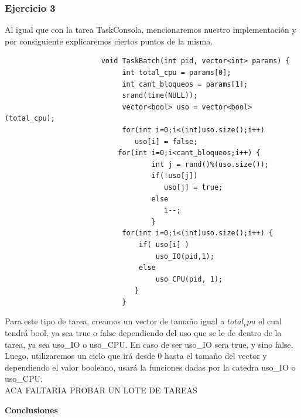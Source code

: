 \subsubsection[Resolución Ejercicio 3]{Ejercicio 3}

\indent Al igual que con la tarea TaskConsola, mencionaremos nuestro implementación y por consiguiente  
explicaremos ciertos puntos de la misma.\\
 \begin{verbatim}
                       void TaskBatch(int pid, vector<int> params) {
                            int total_cpu = params[0];
                            int cant_bloqueos = params[1];
                            srand(time(NULL));
                            vector<bool> uso = vector<bool>(total_cpu);
                            for(int i=0;i<(int)uso.size();i++) 
                               uso[i] = false;
	                       for(int i=0;i<cant_bloqueos;i++) {
                                   int j = rand()%(uso.size());
                                   if(!uso[j])
                                      uso[j] = true;
                                   else
                                      i--; 
                                   }
                            for(int i=0;i<(int)uso.size();i++) {
                                if( uso[i] )
                                    uso_IO(pid,1); 
                                else
                                    uso_CPU(pid, 1); 
                               }
                            }
 \end{verbatim}

 \indent Para este tipo de tarea, creamos un vector de tamaño igual a $total_cpu$ el cual tendrá bool, ya sea true o false
 dependiendo del uso que se le de dentro de la tarea, ya sea uso\_IO o uso\_CPU. En caso de ser uso\_IO sera true, y sino false.\\
 Luego, utilizaremos un ciclo que irá desde 0 hasta el tamaño del vector y dependiendo el valor booleano, usará la funciones
 dadas por la catedra uso\_IO o uso\_CPU.\\
 
 
 ACA FALTARIA PROBAR UN LOTE DE TAREAS
 
  \begin{center}
  \textbf{Conclusiones}
 \end{center}


